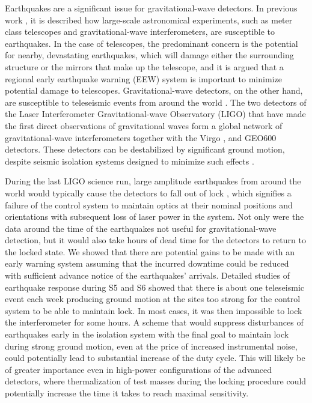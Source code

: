 \documentclass[reprint, prl, aps, showpacs]{revtex4-1}
\begin{document}
Earthquakes are a significant issue for gravitational-wave detectors. In previous work \cite{CoSt2015}, it is described how large-scale astronomical experiments, such as meter class telescopes and gravitational-wave interferometers, are susceptible to earthquakes. In the case of telescopes, the predominant concern is the potential for nearby, devastating earthquakes, which will damage either the surrounding structure or the mirrors that make up the telescope, and it is argued that a regional early earthquake warning (EEW) \cite{Al2012,KuAl2013a,KuAl2013b,KuHe2014,CoLa2009a,CoLa2009b,BoAl2014,HoKa2008,HoEA2011c,StAl2016} system is important to minimize potential damage to telescopes. 
Gravitational-wave detectors, on the other hand, are susceptible to teleseismic events from around the world \cite{MaFa2012}. 
The two detectors of the Laser Interferometer Gravitational-wave Observatory (LIGO) \cite{aligo} that have made the first direct observations of gravitational waves \cite{AbEA2016a,AbEA2016e} form a global network of gravitational-wave interferometers together with the Virgo \cite{avirgo}, and GEO600 \cite{Gr2010} detectors. These detectors can be destabilized by significant ground motion, despite seismic isolation systems designed to minimize such effects \cite{AbAd2002,StAb2009,MaLa2015}.

During the last LIGO science run, large amplitude earthquakes from around the world would typically cause the detectors to fall out of lock \cite{CoSt2015}, which signifies a failure of the control system to maintain optics at their nominal positions and orientations with subsequent loss of laser power in the system. Not only were the data around the time of the earthquakes not useful for gravitational-wave detection, but it would also take hours of dead time for the detectors to return to the locked state. 
We showed that there are potential gains to be made with an early warning system assuming that the incurred downtime could be reduced with sufficient advance notice of the earthquakes' arrivals.
Detailed studies of earthquake response during S5 and S6 showed that there is about one teleseismic event each week producing ground motion at the sites too strong for the control system to be able to maintain lock. In most cases, it was then impossible to lock the interferometer for some hours. A scheme that would suppress disturbances of earthquakes early in the isolation system with the final goal to maintain lock during strong ground motion, even at the price of increased instrumental noise, could potentially lead to substantial increase of the duty cycle. This will likely be of greater importance even in high-power configurations of the advanced detectors, where thermalization of test masses during the locking procedure could potentially increase the time it takes to reach maximal sensitivity.
\end{document}
